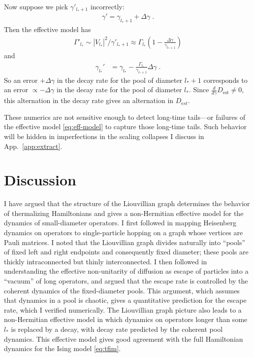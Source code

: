 \documentclass[aps,prb,nofootinbib,twocolumn,balancelastpage,amsmath,amssymb,floatfix,superscriptaddress,]{revtex4-1}
\begin{document}
{Now suppose we pick $\gamma'_{l_*+1}$ incorrectly:
\begin{align}
  \gamma' = \gamma_{l_*+1} + \Delta \gamma\;.
\end{align}
Then the effective model has
\begin{align}
  \Gamma'_{l_*} \sim  |V_{l_*}|^2 / \gamma'_{l_*+1} \approx \Gamma_{l_*}\left(1 - \frac{\Delta\gamma}{\gamma_{l_*+1}}\right)
\end{align}
and
\begin{align}
  \gamma_{l_*}' &= \gamma_{l_*} - \frac{\Gamma_{l_*}}{\gamma_{l_*+1}} \Delta \gamma\;.
\end{align}
So an error $+\Delta \gamma$ in the decay rate for the pool of diameter $l_*+1$
corresponds to an error $\propto -\Delta \gamma$ in the decay rate for the pool of diameter $l_*$.
Since $\frac d {d\gamma}  D_{\mathrm{est}} \ne 0$, this alternation in the decay rate gives an alternation in $D_{\mathrm est}$.



  These numerics are not sensitive enough to detect long-time tails---or failures of the effective model \eqref{eq:eff-model} to capture those long-time tails.
  Such behavior will be hidden in imperfections in the scaling collapses I discuss in App.~\ref{app:extract}.
}
\section{Discussion}\label{s:discussion}

I have argued that the structure of the Liouvillian graph determines the behavior of thermalizing Hamiltonians
and gives a non-Hermitian effective model for the dynamics of small-diameter operators.
I first followed  in mapping Heisenberg dynamics on operators
to single-particle hopping on a graph whose vertices are Pauli matrices.
I noted that the Liouvillian graph divides naturally into ``pools'' of fixed left and right endpoints and consequently fixed diameter;
these pools are thickly intraconnected but thinly interconnected.
I then followed  in understanding the effective non-unitarity of diffusion 
as escape of particles into a ``vacuum'' of long operators,
and argued that the escape rate is controlled by the coherent dynamics of the fixed-diameter pools.
This argument, which assumes that dynamics in a pool is chaotic,
gives a quantitative prediction for the escape rate,
which I verified numerically.
The Liouvillian graph picture also leads to a non-Hermitian effective model
in which dynamics on operators longer than some $l_*$ is replaced by a decay, with decay rate predicted by the coherent pool dynamics.
This effective model gives good agreement with the full Hamiltonian dynamics for the Ising model \eqref{eq:tfim}.
\end{document}
